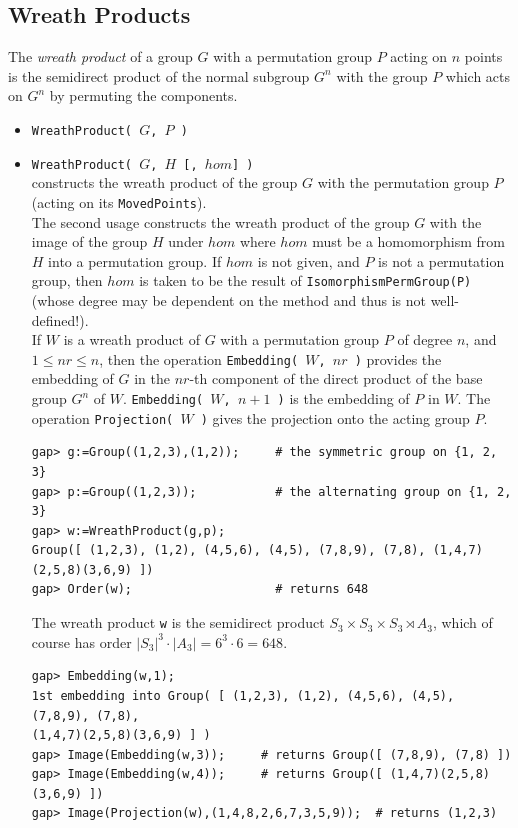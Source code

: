 \documentclass[11pt]{amsart}
\theoremstyle{plain}
\newcommand{\codesize}{\footnotesize}
\newcommand{\<}{\ensuremath{\langle}}
\renewcommand{\>}{\ensuremath{\rangle}}
\renewcommand{\leq}{\ensuremath{\leqslant}}
\begin{document}
\subsection{Wreath Products\protect\footnotemark}
The \emph{wreath product} of a group $G$ with a permutation group $P$ acting on $n$
points is the semidirect product of the normal subgroup $G^n$ with the group $P$
which acts on $G^n$ by permuting the components. 
\begin{itemize}
\item {\tt WreathProduct( $G$, $P$ )}
\item {\tt WreathProduct( $G$, $H$ [, $hom$] )}\\
constructs the wreath product of the group $G$ with the permutation group $P$ 
(acting on its {\tt MovedPoints}). 
\\[4pt]
The second usage constructs the wreath product of the group $G$ with the image of the
group $H$ under $hom$ where $hom$ must be a homomorphism from $H$ into a permutation
group.  If $hom$ is not given, and $P$ is not a permutation group, then $hom$ is
taken to be the result of {\tt IsomorphismPermGroup(P)} (whose degree may be
dependent on the method and thus is not well-defined!).
\\[4pt]
If $W$ is a wreath product of $G$ with a permutation group $P$ of degree $n$, and 
$1 \leq nr \leq n$, then the operation
{\tt Embedding( $W$, $nr$ )} provides the embedding of $G$ in the $nr$-th component
of the direct product of the base group $G^n$ of $W$. {\tt Embedding( $W$, $n+1$ )}
is the embedding of $P$ in $W$. The operation {\tt Projection( $W$ )} 
gives the projection onto the acting group $P$.
{\codesize
\begin{verbatim}
gap> g:=Group((1,2,3),(1,2));     # the symmetric group on {1, 2, 3}
gap> p:=Group((1,2,3));           # the alternating group on {1, 2, 3}
gap> w:=WreathProduct(g,p);
Group([ (1,2,3), (1,2), (4,5,6), (4,5), (7,8,9), (7,8), (1,4,7)(2,5,8)(3,6,9) ])
gap> Order(w);                    # returns 648
\end{verbatim}}
The wreath product {\tt w} is the semidirect product $S_3 \times S_3 \times S_3
\rtimes A_3$, which of course has order $|S_3|^3\cdot |A_3| = 6^3 \cdot 6 = 648$.

{\codesize
\begin{verbatim}
gap> Embedding(w,1);
1st embedding into Group( [ (1,2,3), (1,2), (4,5,6), (4,5), (7,8,9), (7,8),
(1,4,7)(2,5,8)(3,6,9) ] )
gap> Image(Embedding(w,3));     # returns Group([ (7,8,9), (7,8) ])
gap> Image(Embedding(w,4));     # returns Group([ (1,4,7)(2,5,8)(3,6,9) ])
gap> Image(Projection(w),(1,4,8,2,6,7,3,5,9));  # returns (1,2,3)


\end{verbatim}}
\end{itemize}
\end{document}
